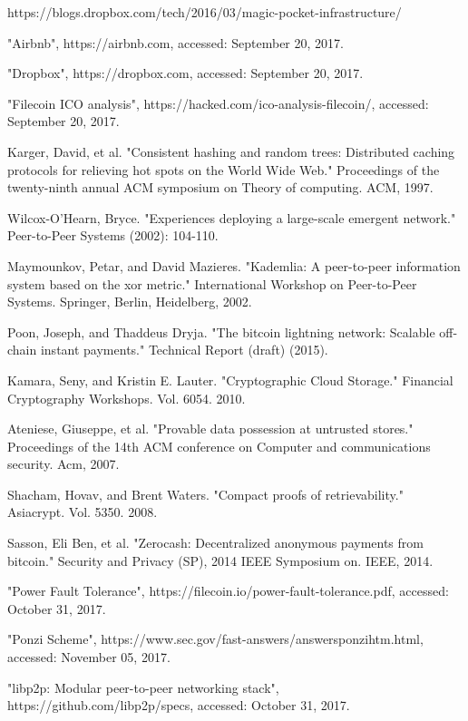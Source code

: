 \documentclass[conference]{IEEEtran}
\begin{document}
\begin{thebibliography}{1}
 https://blogs.dropbox.com/tech/2016/03/magic-pocket-infrastructure/

 "Airbnb", https://airbnb.com, accessed: September 20, 2017.

 "Dropbox", https://dropbox.com, accessed: September 20, 2017.

 "Filecoin ICO analysis", https://hacked.com/ico-analysis-filecoin/, accessed: September 20, 2017.

 Karger, David, et al. "Consistent hashing and random trees: Distributed caching protocols for relieving hot spots on the World Wide Web." Proceedings of the twenty-ninth annual ACM symposium on Theory of computing. ACM, 1997.

 Wilcox-O’Hearn, Bryce. "Experiences deploying a large-scale emergent network." Peer-to-Peer Systems (2002): 104-110.

 Maymounkov, Petar, and David Mazieres. "Kademlia: A peer-to-peer information system based on the xor metric." International Workshop on Peer-to-Peer Systems. Springer, Berlin, Heidelberg, 2002.

 Poon, Joseph, and Thaddeus Dryja. "The bitcoin lightning network: Scalable off-chain instant payments." Technical Report (draft) (2015).

 Kamara, Seny, and Kristin E. Lauter. "Cryptographic Cloud Storage." Financial Cryptography Workshops. Vol. 6054. 2010.

 Ateniese, Giuseppe, et al. "Provable data possession at untrusted stores." Proceedings of the 14th ACM conference on Computer and communications security. Acm, 2007.

 Shacham, Hovav, and Brent Waters. "Compact proofs of retrievability." Asiacrypt. Vol. 5350. 2008.

 Sasson, Eli Ben, et al. "Zerocash: Decentralized anonymous payments from bitcoin." Security and Privacy (SP), 2014 IEEE Symposium on. IEEE, 2014.

 "Power Fault Tolerance", https://filecoin.io/power-fault-tolerance.pdf, accessed: October 31, 2017.

 "Ponzi Scheme", https://www.sec.gov/fast-answers/answersponzihtm.html, accessed: November 05, 2017.

 "libp2p: Modular peer-to-peer networking stack", https://github.com/libp2p/specs, accessed: October 31, 2017.

\end{thebibliography}
\end{document}
